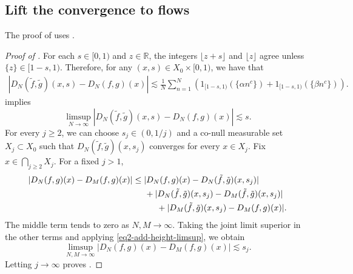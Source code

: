 \documentclass[reqno,12pt]{amsart}
\newtheorem{lemma}[thm]{Lemma}
\def \R {\mathbb R}
\numberwithin{equation}{section}
\begin{document}
\subsection{Lift the convergence to flows}
The proof of  uses .
\begin{proof}[Proof of ]
For each $s\in[0,1)$ and $z\in\R$, the integers $\lfloor z+s\rfloor$
and $\lfloor z\rfloor$ agree unless $\{z\}\in[1-s,1)$. Therefore, for
any $(x,s)\in X_0\times[0,1)$, we have that
\begin{align}
 |D_N(\tilde f,\tilde g)(x,s)-D_N(f,g)(x)|
\lesssim \frac1N\sum_{n=1}^N
 \left(1_{[1-s,1)}(\{\alpha n^c\})
       +1_{[1-s,1)}(\{\beta n^c\})\right).
 \label{eq2-add-height-error}
\end{align}
 implies
\begin{equation}
 \limsup_{N\to\infty}
 |D_N(\tilde f,\tilde g)(x,s)-D_N(f,g)(x)|\lesssim s.
 \label{eq2-add-height-limsup}
\end{equation}
For every $j\ge2$, we can choose $s_j\in(0,1/j)$ and a co-null
measurable set $X_j\subset X_0$ such that $D_N(\tilde f,\tilde g)(x,s_j)$
converges for every $x\in X_j$. Fix $\displaystyle x\in\bigcap_{j\ge2}X_j$.
For a fixed $j>1$,
\begin{align*}
 |D_N(f,g)(x)-D_M(f,g)(x)|
 &\le |D_N(f,g)(x)-D_N(\tilde f,\tilde g)(x,s_j)|\\
 &\hspace{0.5cm}+|D_N(\tilde f,\tilde g)(x,s_j)
             -D_M(\tilde f,\tilde g)(x,s_j)|\\
 &\hspace{1cm}+|D_M(\tilde f,\tilde g)(x,s_j)-D_M(f,g)(x)|.
\end{align*}
The middle term tends to zero as $N,M\to\infty$. Taking the joint
limit superior in the other terms and applying
\eqref{eq2-add-height-limsup}, we obtain
\[
 \limsup_{N,M\to\infty}|D_N(f,g)(x)-D_M(f,g)(x)|\lesssim s_j.
\]
Letting $j\to\infty$ proves .
\end{proof}
\end{document}
